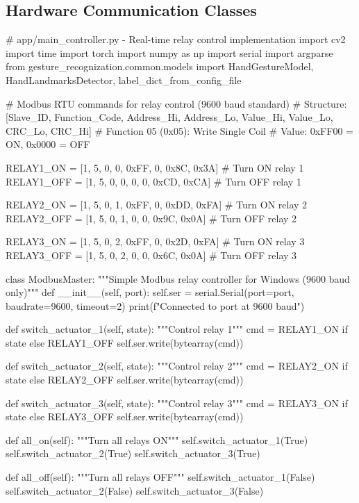 \subsection{Hardware Communication Classes}

\begin{aivncodebox}
\begin{python}
# app/main_controller.py - Real-time relay control implementation
import cv2
import time
import torch
import numpy as np
import serial
import argparse
from gesture_recognization.common.models import HandGestureModel, HandLandmarksDetector, label_dict_from_config_file

# Modbus RTU commands for relay control (9600 baud standard)
# Structure: [Slave_ID, Function_Code, Address_Hi, Address_Lo, Value_Hi, Value_Lo, CRC_Lo, CRC_Hi]
# Function 05 (0x05): Write Single Coil
# Value: 0xFF00 = ON, 0x0000 = OFF

RELAY1_ON =  [1, 5, 0, 0, 0xFF, 0, 0x8C, 0x3A]  # Turn ON relay 1
RELAY1_OFF = [1, 5, 0, 0, 0,    0, 0xCD, 0xCA]  # Turn OFF relay 1

RELAY2_ON =  [1, 5, 0, 1, 0xFF, 0, 0xDD, 0xFA]  # Turn ON relay 2
RELAY2_OFF = [1, 5, 0, 1, 0,    0, 0x9C, 0x0A]  # Turn OFF relay 2

RELAY3_ON =  [1, 5, 0, 2, 0xFF, 0, 0x2D, 0xFA]  # Turn ON relay 3
RELAY3_OFF = [1, 5, 0, 2, 0,    0, 0x6C, 0x0A]  # Turn OFF relay 3

class ModbusMaster:
    """Simple Modbus relay controller for Windows (9600 baud only)"""
    def __init__(self, port):
        self.ser = serial.Serial(port=port, baudrate=9600, timeout=2)
        print(f"Connected to {port} at 9600 baud")
    
    def switch_actuator_1(self, state):
        """Control relay 1"""
        cmd = RELAY1_ON if state else RELAY1_OFF
        self.ser.write(bytearray(cmd))
    
    def switch_actuator_2(self, state):
        """Control relay 2"""
        cmd = RELAY2_ON if state else RELAY2_OFF
        self.ser.write(bytearray(cmd))
    
    def switch_actuator_3(self, state):
        """Control relay 3"""
        cmd = RELAY3_ON if state else RELAY3_OFF
        self.ser.write(bytearray(cmd))
    
    def all_on(self):
        """Turn all relays ON"""
        self.switch_actuator_1(True)
        self.switch_actuator_2(True)
        self.switch_actuator_3(True)
    
    def all_off(self):
        """Turn all relays OFF"""
        self.switch_actuator_1(False)
        self.switch_actuator_2(False)
        self.switch_actuator_3(False)
    

\end{python}
\end{aivncodebox}
